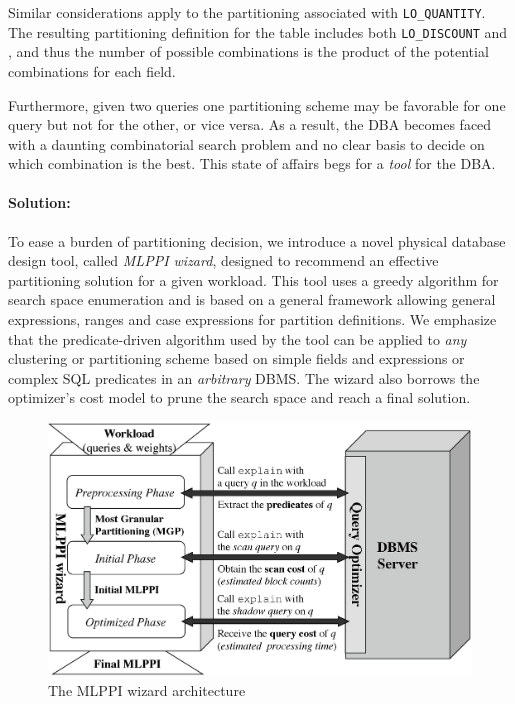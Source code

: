 \documentclass[runningheads]{comsis2}
\begin{document}

Similar considerations apply to the partitioning associated with {\tt LO\_QUANTITY}. 
The resulting partitioning definition for the table includes both {\tt LO\_DISCOUNT}
and , and thus the number of possible combinations is the product of 
the potential combinations for each field. 

Furthermore, given two queries one partitioning scheme may be favorable for one query but not for the other, or vice versa. 
As a result, the DBA becomes faced with a daunting combinatorial search problem 
and no clear basis to decide on which combination is the best. 
This state of affairs begs for a {\em tool} for the DBA.

\paragraph{Solution:} 
To ease a burden of partitioning decision, 
we introduce a novel physical database design tool, called {\em MLPPI wizard}, 
designed to recommend an effective partitioning solution for a given workload.
This tool uses a greedy algorithm for search space enumeration 
and is based on a general framework allowing general expressions, 
ranges and case expressions for partition definitions. 
We emphasize that the \hbox{predicate-driven} algorithm used by the tool can be applied 
to {\em any} clustering or partitioning scheme based on simple fields and expressions or complex SQL predicates 
in an {\em arbitrary} DBMS. 
The wizard also borrows the optimizer's cost model 
to prune the search space and reach a final solution. 

\begin{figure}[htp!]
\centering
\includegraphics[scale=0.45]{architecture}
\vspace{-0.1in}
\caption{The MLPPI wizard architecture\label{fig:arch}}
\end{figure}
\end{document}
